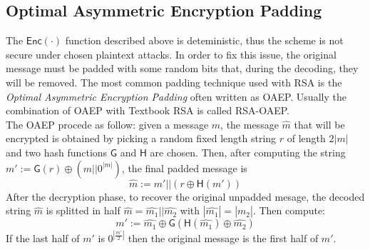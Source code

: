 \subsection{Optimal Asymmetric Encryption Padding}
The $\mathsf{Enc(\cdot)}$ function described above is deteministic, thus the scheme is not secure under chosen plaintext attacks. In order to fix this issue, the original message must be padded with some random bits that, during the decoding, they will be removed. The most common padding technique used with RSA is the \emph{Optimal Asymmetric Encryption Padding} often written as OAEP. Usually the combination of OAEP with Textbook RSA is called RSA-OAEP.\\
The OAEP procede as follow: given a message $m$, the message $\hat{m}$ that will be encrypted is obtained by picking a random fixed length string $r$ of length $2|m|$ and two hash functions $\mathsf{G}$ and $\mathsf{H}$ are chosen. Then, after computing the string $m' := \mathsf{G}(r) \oplus (m||0^{|m|})$, the final padded message is
$$
    \hat{m} := m'||(r \oplus \mathsf{H}(m'))
$$
After the decryption phase, to recover the original unpadded mesage, the decoded string $\hat{m}$ is splitted in half $\hat{m} = \hat{m_1}||\hat{m_2}$ with $|\hat{m_1}|=|\hat{m_2}|$. Then compute:
$$
    m' := \hat{m_1} \oplus \mathsf{G}(\mathsf{H}(\hat{m_1}) \oplus \hat{m_2})
$$
If the last half of $m'$ is $0^{|\frac{m'}{2}|}$ then the original message is the first half of $m'$.
